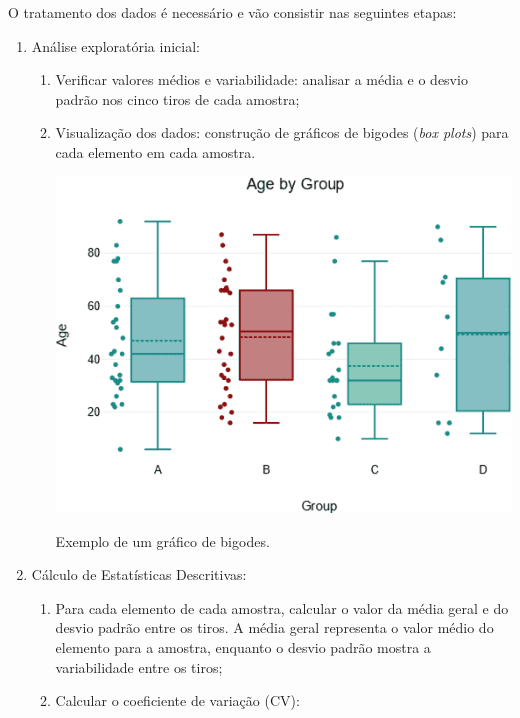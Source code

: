 O tratamento dos dados é necessário e vão consistir nas seguintes etapas:
\begin{enumerate}
    \item Análise exploratória inicial:
    \begin{enumerate}
        \item Verificar valores médios e variabilidade: analisar a média e o desvio padrão nos cinco tiros de cada amostra;
        \item Visualização dos dados: construção de gráficos de bigodes (\emph{box plots}) para cada elemento em cada amostra.
        \begin{marginfigure}
            \includegraphics[width=\linewidth]{figures/exemplo_boxplot}
            \caption{Exemplo de um gráfico de bigodes.}
            \label{fig:boxplot_example}
        \end{marginfigure}
    \end{enumerate}
    \item Cálculo de Estatísticas Descritivas:
    \begin{enumerate}
        \item Para cada elemento de cada amostra, calcular o valor da média geral e do desvio padrão entre os tiros.
        A média geral representa o valor médio do elemento para a amostra, enquanto o desvio padrão mostra a variabilidade entre os tiros;
        \item Calcular o coeficiente de variação (CV):
\end{enumerate}
\end{enumerate}
